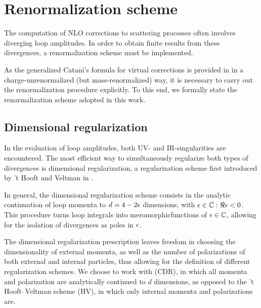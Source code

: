 
\section{Renormalization scheme}

The computation of NLO corrections to scattering processes often involves diverging loop amplitudes. In order to obtain finite results from these divergences, a renormalization scheme must be implemented.

As the generalized Catani's formula for virtual corrections is provided in \cite{Catani-2001} in a charge-unrenormalized (but mass-renormalized) way, it is necessary to carry out the renormalization procedure explicitly. To this end, we formally state the renormalization scheme adopted in this work.

\subsection{Dimensional regularization}

In the evaluation of loop amplitudes, both UV- and IR-singularities are encountered. The most efficient way to simultaneously regularize both types of divergences is dimensional regularization, a regularization scheme first introduced by 't Hooft and Veltman in \cite{Thooft-1972}.

In general, the dimensional regularization scheme consists in the analytic continuation of loop momenta to $ d = 4 - 2 \epsilon $ dimensions, with $ \epsilon \in \mathbb{C} : \Re\epsilon < 0 $. This procedure turns loop integrals into meromorphic\footnotemark functions of $ \epsilon \in \mathbb{C} $, allowing for the isolation of divergences as poles in $ \epsilon $.


The dimensional regularization prescription leaves freedom in choosing the dimensionality of external momenta, as well as the number of polarizations of both external and internal particles, thus allowing for the definition of different regularization schemes. We choose to work with  (CDR), in which all momenta and polarization are analytically continued to $ d $ dimensions, as opposed to the 't Hooft--Veltman scheme (HV), in which only internal momenta and polarizations are.


